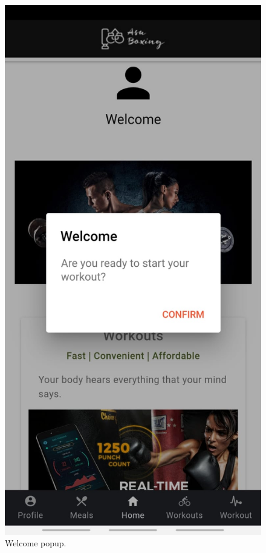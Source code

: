 \documentclass[a4paper,12pt]{report}
\begin{document}
\begin{figure}[ht]
\begin{minipage}[b]{0.5\linewidth}
    \includegraphics[width=.7\linewidth]{images/aplicationImages/welcomePopUp.jpeg} 
    \caption{Welcome popup.} 
    \vspace{4ex}
  \end{minipage}%
  \begin{minipage}[b]{0.5\linewidth}
    \centering

\end{minipage}
\end{figure}
\end{document}
